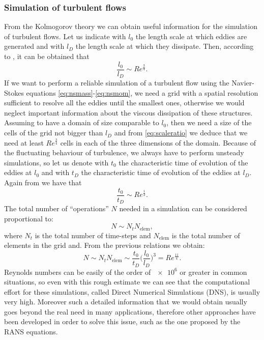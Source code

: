 \subsubsection{Simulation of turbulent flows}
From the Kolmogorov theory we can obtain useful information for the simulation 
of turbulent flows. Let us indicate with $l_0$ the length scale at which 
eddies are generated and with $l_D$ the length scale at which they dissipate. 
Then, according to \cite{turbo:kolmogorov}, it can be obtained that
\begin{equation} \label{eq:scaleratio}
	\frac{l_0}{l_D} \sim Re^\frac{3}{4}.
\end{equation}
If we want to perform a reliable simulation of a turbulent flow using the 
Navier-Stokes equations \eqref{eq:nsmass}-\eqref{eq:nsmom}, we need a grid with 
a spatial resolution sufficient to resolve all the eddies until the smallest 
ones, otherwise we would neglect important information about the viscous 
dissipation of these structures. Assuming to have a domain of size comparable 
to $l_0$, then we need a size of the cells of the grid not bigger than $l_D$ and
from \eqref{eq:scaleratio} we deduce that we need at least $Re^\frac{3}{4}$ 
cells in each of the three dimensions of the domain. Because of the fluctuating 
behaviour of turbulence, we always have to perform unsteady simulations, so let 
us denote with $t_0$ the characteristic time of evolution of the eddies at 
$l_0$ and with $t_D$ the characteristic time of evolution of the eddies at 
$l_D$. Again from \cite{turbo:kolmogorov} we have that
\begin{equation}
\frac{t_0}{t_D} \sim Re^\frac{1}{2}.
\end{equation}
The total number of ``operations'' $N$ needed in a simulation can be considered 
proportional to:
\begin{equation}
	N \sim  N_t N_\text{elem},
\end{equation}
where $N_t$ is the total number of time-steps and $N_\text{elem}$ is the total 
number 
of elements in the grid and. From the previous relations we obtain:
\begin{equation}
	N \sim N_t N_\text{elem} \sim \frac{t_0}{t_D} \bigg(\frac{l_0}{l_D}\bigg)^3 
	= Re^\frac{11}{4}.
\end{equation}
Reynolds numbers can be easily of the order of $\num{e6}$ or greater in common 
situations, so even with this rough estimate we can see that the computational 
effort for these simulations, called Direct Numerical Simulations (DNS), is 
usually very high. Moreover such a detailed information that we would obtain 
usually goes beyond the real need in many applications, therefore other 
approaches have been developed in order to solve this issue, such as the one 
proposed by the RANS equations.
%

